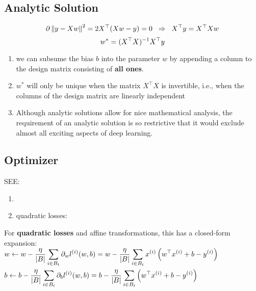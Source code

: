 \subsection{Analytic Solution \cite{dnn-1}}

\[
    \hfill
    \partial\dnorm{y - Xw}^2 = 2X^\top (Xw - y) = 0
    \hspace{0.2cm}
    \Rightarrow
    \hspace{0.2cm}
    X^\top y = X^\top Xw
    \hfill
\]
\[
    \hfill
    w^\ast = (X^\top X)^{-1}X^\top y
    \hfill
\]

\begin{enumerate}
    \item we can subsume the bias $b$ into the parameter $w$ by appending a column to the design matrix consisting of \textbf{all ones}.

    \item $w^\ast$ will only be unique when the matrix $X^\top X$ is invertible, i.e., when the columns of the design matrix are linearly independent

    \item Although analytic solutions allow for nice mathematical analysis, the requirement of an analytic solution is so restrictive that it would exclude almost all exciting aspects of deep learning.

\end{enumerate}




\subsection{Optimizer \cite{dnn-1}}
SEE: 
\begin{enumerate}
    \item {}

    \item quadratic losses: 
\end{enumerate}

\vspace{0.5cm}
\noindent
For \textbf{quadratic losses} and affine transformations, this has a closed-form expansion:\\[1ex]
$\begin{aligned}
    &w \leftarrow 
    w - \dfrac{\eta}{\left| B \right|} \displaystyle\sum_{i \in B_t} 
        \partial_{w} l^{(i)}(w,b)
    = w - \dfrac{\eta}{\left| B \right|} \displaystyle\sum_{i \in B_t} 
        x^{(i)} \left(w^\top x^{(i)} + b - y^{(i)}\right) \\
    &b \leftarrow 
    b - \dfrac{\eta}{\left| B \right|} \displaystyle\sum_{i \in B_t} 
        \partial_{b} l^{(i)}(w,b)
    = b - \dfrac{\eta}{\left| B \right|} \displaystyle\sum_{i \in B_t} 
        \left(w^\top x^{(i)} + b - y^{(i)}\right) \\
\end{aligned}$

